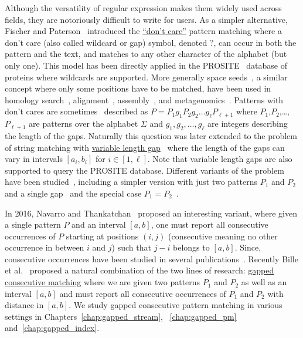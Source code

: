 Although the versatility of regular expression makes them widely used across fields, they are notoriously difficult to write for users.
As a simpler alternative, Fischer and Paterson~\cite{fischer1974string} introduced the \underline{``don't care''} pattern matching where a don't care (also called wildcard or gap) symbol, denoted ?, can occur in both the pattern and the text, and matches to any other character of the alphabet (but only one).
This model has been directly applied in the PROSITE~\cite{hulo2006prosite} database of proteins where wildcards are supported. More generally space seeds~\cite{li2004patternhunter}, a similar concept where only some positions have to be matched, have been used in homology search~\cite{ma2002patternhunter}, alignment~\cite{david2011shrimp2}, assembly~\cite{birol2015spaced}, and metagenomics~\cite{bvrinda2015spaced}.
Patterns with don't cares are sometimes~\cite{lewenstein2011indexing} described as $P= P_1g_1P_2g_2 \dots g_\ell P_{\ell+1}$ where $P_1$,$P_2$,\dots,$P_{\ell+1}$ are patterns over the alphabet $\Sigma$ and $g_1,g_2,\dots,g_{\ell}$ are integers describing the length of the gaps. 
Naturally this question was later extended to the problem of string matching with \underline{variable length gap}~\cite{bille2012string,bille2014string} where the length of the gaps can vary in intervals $[a_i,b_i]$ for $i\in[1,\ell]$.
Note that variable length gaps are also supported to query the PROSITE database.
Different variants of the problem have been studied~\cite{kopelowitz2016color,cohen2009range,brodal1999finding}, including a simpler version with just two patterns $P_1$ and $P_2$ and a single gap~\cite{peterlongo2006gapped,iliopoulos2009indexing} and the special case $P_1=P_2$~\cite{muthukrishnan2002efficient,keller2007range}.

In 2016, Navarro and Thankatchan~\cite{NAVARRO2016108} proposed an interesting variant, where given a single pattern $P$ and an interval $[a,b]$, one must report all consecutive occurrences of $P$ starting at positions $(i,j)$ (consecutive meaning no other occurrence in between $i$ and $j$) such that $j-i$ belongs to $[a,b]$. Since, consecutive occurrences have been studied in several publications~\cite{DBLP:conf/fsttcs/BilleGPRS20,cpm/BilleGPS21,DBLP:journals/corr/abs-2304-00887,DBLP:journals/corr/abs-2211-16860}.
Recently Bille et al.~\cite{bille2022gapped} proposed a natural combination of the two lines of research: \underline{gapped consecutive matching} where we are given two patterns $P_1$ and $P_2$ as well as an interval $[a,b]$ and must report all consecutive occurrences of $P_1$ and $P_2$ with distance in $[a,b]$.
We study gapped consecutive pattern matching in various settings in Chapters~\ref{chap:gapped_stream}, ~\ref{chap:gapped_pm} and~\ref{chap:gapped_index}.


